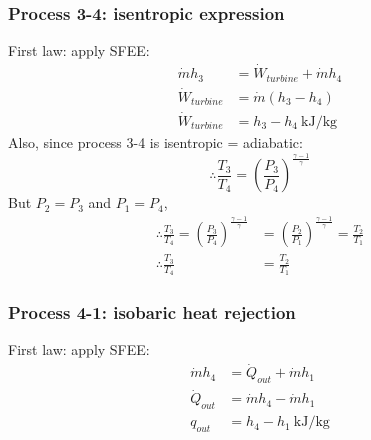\subsubsection{Process 3-4: isentropic expression}
First law: apply SFEE:
\begin{align}
  \dot{m} h_3       & = \dot{W}_{turbine} + \dot{m} h_4     \\
  \dot{W}_{turbine} & = \dot{m} (h_3 - h_4)                 \\
  \dot{W}_{turbine} & = h_3 - h_4 \ \si{\kilo\joule\per\kg}
\end{align}
Also, since process 3-4 is isentropic = adiabatic:
\begin{equation}
  \therefore \frac{T_3}{T_4} = \left( \frac{P_3}{P_4} \right)^{\frac{\gamma -1}{\gamma}}
\end{equation}
But $P_2 = P_3$ and $P_1 = P_4$,
\begin{align}
  \therefore \frac{T_3}{T_4} = \left( \frac{P_3}{P_4} \right)^{\frac{\gamma -1}{\gamma}} & = \left( \frac{P_2}{P_1} \right)^{\frac{\gamma -1}{\gamma}} = \frac{T_2}{T_1} \\
  \therefore \frac{T_3}{T_4}                                                             & = \frac{T_2}{T_1}
\end{align}
\subsubsection{Process 4-1: isobaric heat rejection}
First law: apply SFEE:
\begin{align}
  \dot{m} h_4   & = \dot{Q}_{out} + \dot{m} h_1         \\
  \dot{Q}_{out} & = \dot{m} h_4 - \dot{m} h_1           \\
  q_{out}       & = h_4 - h_1 \ \si{\kilo\joule\per\kg}
\end{align}
